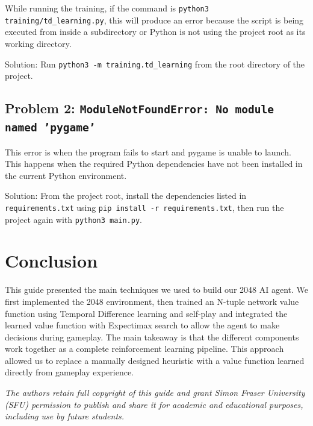 \documentclass[10pt]{article}
\begin{document}
While running the training, if the command is \texttt{python3 training/td\_learning.py}, this will produce an error because the script is being executed from inside a subdirectory or Python is not using the project root as its working directory.

Solution: Run \texttt{python3 -m training.td\_learning} from the root directory of the project.

\subsection*{Problem 2: \texttt{ModuleNotFoundError: No module named 'pygame'}}

This error is when the program fails to start and pygame is unable to launch. This happens when the required Python dependencies have not been installed in the current Python environment.

Solution: From the project root, install the dependencies listed in \texttt{requirements.txt} using \texttt{pip install -r requirements.txt}, then run the project again with \texttt{python3 main.py}.

\section*{Conclusion}

This guide presented the main techniques we used to build our 2048 AI agent. We first implemented the 2048 environment, then trained an N-tuple network value function using Temporal Difference learning and self-play and integrated the learned value function with Expectimax search to allow the agent to make decisions during gameplay. The main takeaway is that the different components work together as a complete reinforcement learning pipeline. This approach allowed us to replace a manually designed heuristic with a value function learned directly from gameplay experience.

\vfill
{\footnotesize\itshape\color{gray} The authors retain full copyright of this guide and grant Simon Fraser University (SFU) permission to publish and share it for academic and educational purposes, including use by future students.}
\end{document}
